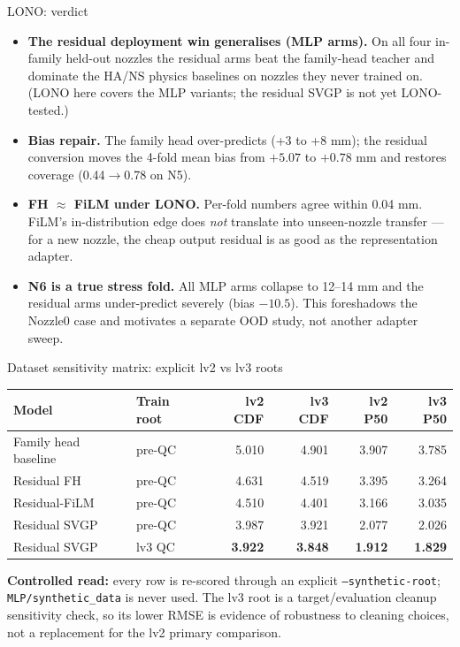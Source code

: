 \documentclass[UTF8,aspectratio=169]{ctexbeamer}
\newcommand{\good}[1]{\textcolor{green!45!black}{#1}}
\begin{document}
\begin{frame}{LONO: verdict}
\small
\begin{itemize}\setlength\itemsep{3pt}
  \item \textbf{The residual deployment win generalises (MLP arms).} On all four
        in-family held-out nozzles the residual arms beat the family-head teacher and
        dominate the HA/NS physics baselines on nozzles they never trained on. (LONO
        here covers the MLP variants; the residual SVGP is not yet LONO-tested.)
  \item \textbf{Bias repair.} The family head over-predicts (+3 to +8 mm); the
        residual conversion moves the 4-fold mean bias from \(+5.07\) to
        \good{$+0.78$} mm and restores coverage (0.44$\to$0.78 on N5).
  \item \textbf{FH $\approx$ FiLM under LONO.} Per-fold numbers agree within 0.04 mm.
        FiLM's in-distribution edge does \emph{not} translate into unseen-nozzle
        transfer --- for a new nozzle, the cheap output residual is as good as the
        representation adapter.
  \item \textbf{N6 is a true stress fold.} All MLP arms collapse to 12--14 mm and the
        residual arms under-predict severely (bias $-10.5$). This foreshadows the
        Nozzle0 case and motivates a separate OOD study, not another adapter sweep.
\end{itemize}
\end{frame}

\begin{frame}{Dataset sensitivity matrix: explicit lv2 vs lv3 roots}
\small
\begin{center}
\scriptsize
\renewcommand{\arraystretch}{1.12}
\setlength{\tabcolsep}{4pt}
\begin{tabular}{@{}llrrrr@{}}
\toprule
\textbf{Model} & \textbf{Train root} & \textbf{lv2 CDF} & \textbf{lv3 CDF} & \textbf{lv2 P50} & \textbf{lv3 P50} \\
\midrule
Family head baseline & pre-QC & 5.010 & 4.901 & 3.907 & 3.785 \\
Residual FH          & pre-QC & 4.631 & 4.519 & 3.395 & 3.264 \\
Residual-FiLM        & pre-QC & 4.510 & 4.401 & 3.166 & 3.035 \\
Residual SVGP        & pre-QC & 3.987 & 3.921 & 2.077 & 2.026 \\
\rowcolor{winrow}
Residual SVGP        & lv3 QC & \textbf{3.922} & \textbf{3.848} & \textbf{1.912} & \textbf{1.829} \\
\bottomrule
\end{tabular}
\end{center}
\vspace{0.25em}
\footnotesize
\textbf{Controlled read:} every row is re-scored through an explicit
\texttt{--synthetic-root}; \texttt{MLP/synthetic\_data} is never used. The lv3 root is
a target/evaluation cleanup sensitivity check, so its lower RMSE is evidence of
robustness to cleaning choices, not a replacement for the lv2 primary comparison.
\end{frame}
\end{document}

